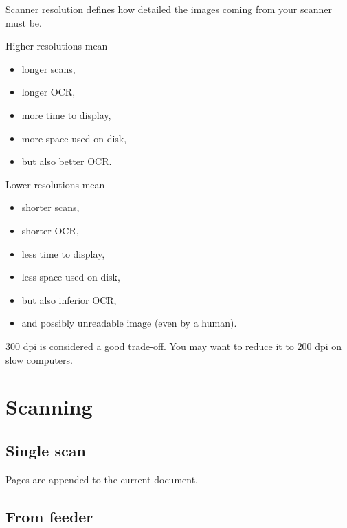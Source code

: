 \documentclass[10pt,a4paper]{article}
\begin{document}
Scanner resolution defines how detailed the images coming from your
scanner must be.

Higher resolutions mean
\begin{itemize}
\item longer scans,
\item longer OCR,
\item more time to display,
\item more space used on disk,
\item but also better OCR.
\end{itemize}
Lower resolutions mean
\begin{itemize}
\item shorter scans,
\item shorter OCR,
\item less time to display,
\item less space used on disk,
\item but also inferior OCR,
\item and possibly unreadable image (even by a human).
\end{itemize}
300 dpi is considered a good trade-off. You may want to reduce it
to 200 dpi on slow computers.

\section{Scanning}

\subsection{Single scan}


Pages are appended to the current document.

\subsection{\label{subsec:From-feeder}From feeder}

\end{document}

